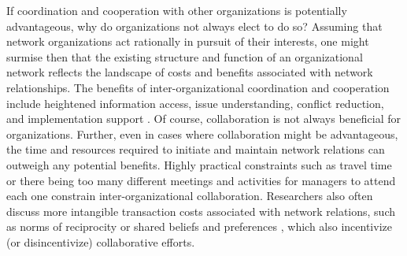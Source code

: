 \documentclass[12pt,a4paper,titlepage]{article}
\begin{document}
If coordination and cooperation with other organizations is potentially advantageous, why do organizations not always elect to do so? Assuming that network organizations act rationally in pursuit of their interests, one might surmise then that the existing structure and function of an organizational network reflects the landscape of costs and benefits associated with network relationships. The benefits of inter-organizational coordination and cooperation include heightened information access, issue understanding, conflict reduction, and implementation support \parencite{moreland1993,gigone1993,cragan1990,hill2003,susskind1999,sabatier2005}. Of course, collaboration is not always beneficial for organizations. Further, even in cases where collaboration might be advantageous, the time and resources required to initiate and maintain network relations can outweigh any potential benefits. Highly practical constraints such as travel time \parencite{thomas2003} or there being too many different meetings and activities for managers to attend each one \parencite{margerum2011} constrain inter-organizational collaboration. Researchers also often discuss more intangible transaction costs associated with network relations, such as norms of reciprocity \parencite{putnam2000} or shared beliefs and preferences \parencite{schneider2003, sabatier1993}, which also incentivize (or disincentivize) collaborative efforts.
\end{document}
